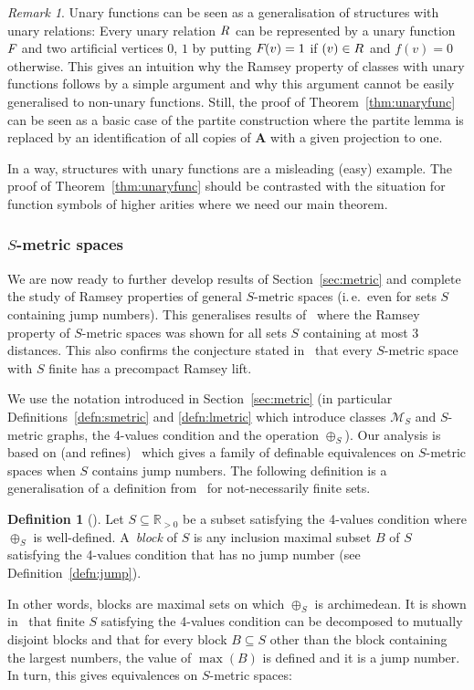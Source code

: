 \documentclass{elsarticle}
\newcommand{\ie}{i.\,e.}
\def\str#1{\mathbf {#1}}
\def\nbrel#1#2{R\ifstrempty{#1}{}{_{#1}}\ifstrempty{#2}{}{^{#2}}}
\def\rel#1#2{\nbrel{\ifstrempty{#1}{}{\str{#1}}}{#2}}
\def\func#1#2{\nbfunc{\ifstrempty{#1}{}{\str{#1}}}{#2}}
\def\nbfunc#1#2{F\ifstrempty{#1}{}{_{#1}}\ifstrempty{#2}{}{^{#2}}}
\theoremstyle{plain}
\theoremstyle{definition}
\newtheorem{definition}[theorem]{Definition}
\theoremstyle{remark}
\newtheorem*{remark}{Remark}
\begin{document}
\begin{remark}
Unary functions can be seen as a generalisation of structures
with unary relations: Every unary relation $\rel{}{}$ can be represented by a unary function $\func{}{}$ and two artificial vertices $0$, $1$ by putting $\func{}{}(v)=1$ if $(v)\in \rel{}{}$ and $f(v)=0$ otherwise.  This gives an intuition why the Ramsey property of
classes with unary functions follows by a simple argument and why this argument cannot be easily generalised to non-unary functions.
Still, the proof of Theorem~\ref{thm:unaryfunc} can be seen as a basic case of the partite construction where the partite lemma
is replaced by an identification of all copies of $\str{A}$ with a given projection to one.
\end{remark}

In a way, structures with unary functions are a misleading (easy) example.
The proof of Theorem~\ref{thm:unaryfunc} should be contrasted with the situation for function symbols of higher arities where we need our main theorem. 

\subsubsection {$S$-metric spaces}
\label{sec:metric2}
We are now ready to further develop results of Section~\ref{sec:metric} and
complete the study of Ramsey properties of general $S$-metric spaces (\ie{}\ even for sets $S$ containing jump numbers).
This generalises results of~\cite[Theorem 25]{The2010} where the Ramsey property of $S$-metric spaces was shown for all sets $S$ containing at most
3 distances. This also confirms the conjecture stated in~\cite{The2010} that every $S$-metric space with $S$ finite has a precompact Ramsey lift.

We use the notation introduced in Section~\ref{sec:metric} (in particular Definitions~\ref{defn:smetric} and \ref{defn:lmetric} which introduce classes $\mathcal M_S$ and $S$-metric graphs, the 4-values condition and the operation $\oplus_S$).
Our analysis is based on (and refines)~\cite{Sauer2012} which gives a family of definable
equivalences on $S$-metric spaces when $S$ contains jump numbers. The following definition is a generalisation of a definition from~\cite{Sauer2012} for not-necessarily finite sets.

\begin{definition}[\cite{Sauer2012}]
Let $S\subseteq \mathbb R_{>0}$ be a subset satisfying the 4-values condition where $\oplus_S$ is well-defined.
A~\emph{block} of $S$ is any inclusion maximal subset $B$ of $S$ satisfying the 4-values condition
that has no jump number (see Definition~\ref{defn:jump}).
\end{definition}
In other words, blocks are maximal sets on which $\oplus_S$ is archimedean. It is shown in~\cite{Sauer2012} that finite $S$ satisfying the 4-values condition can be decomposed to mutually disjoint blocks and that for every block $B\subseteq S$ other than the block containing the largest numbers, the value of $\max(B)$ is defined and it is a jump number. In turn, this gives equivalences on $S$-metric spaces:
\end{document}
